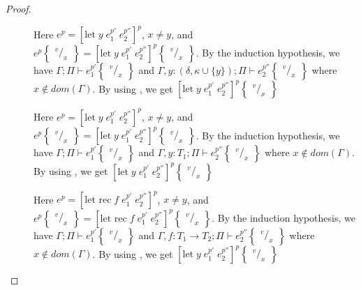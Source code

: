 \documentclass[../../master.tex]{subfiles}
\begin{document}
\begin{proof}
\begin{description}
		\item[] Here $e^p=[\mbox{let}\;y\;e_1^{p'}\;e_2^{p''}]^p$, $x\neq y$, and $e^p\begin{Bmatrix} ^v/_x \end{Bmatrix}=[\mbox{let}\;y\;e_1^{p'}\;e_2^{p''}]^p\begin{Bmatrix} ^v/_x \end{Bmatrix}$.
			By the induction hypothesis, we have $\Gamma;\Pi\vdash e_1^{p'}\begin{Bmatrix} ^v/_x \end{Bmatrix}$ and $\Gamma,y:(\delta,\kappa\cup\{y\});\Pi\vdash e_2^{p''}\begin{Bmatrix} ^v/_x \end{Bmatrix}$ where $x\notin dom(\Gamma)$.
			By using , we get $[\mbox{let}\;y\;e_1^{p'}\;e_2^{p''}]^p\begin{Bmatrix} ^v/_x \end{Bmatrix}$

		\item[] Here $e^p=[\mbox{let}\;y\;e_1^{p'}\;e_2^{p''}]^p$, $x\neq y$, and $e^p\begin{Bmatrix} ^v/_x \end{Bmatrix}=[\mbox{let}\;y\;e_1^{p'}\;e_2^{p''}]^p\begin{Bmatrix} ^v/_x \end{Bmatrix}$.
			By the induction hypothesis, we have $\Gamma;\Pi\vdash e_1^{p'}\begin{Bmatrix} ^v/_x \end{Bmatrix}$ and $\Gamma,y:T_1;\Pi\vdash e_2^{p''}\begin{Bmatrix} ^v/_x \end{Bmatrix}$ where $x\notin dom(\Gamma)$.
			By using , we get $[\mbox{let}\;y\;e_1^{p'}\;e_2^{p''}]^p\begin{Bmatrix} ^v/_x \end{Bmatrix}$

		\item[] Here $e^p=[\mbox{let rec}\;f\;e_1^{p'}\;e_2^{p''}]^p$, $x\neq y$, and $e^p\begin{Bmatrix} ^v/_x \end{Bmatrix}=[\mbox{let rec}\;f\;e_1^{p'}\;e_2^{p''}]^p\begin{Bmatrix} ^v/_x \end{Bmatrix}$.
			By the induction hypothesis, we have $\Gamma;\Pi\vdash e_1^{p'}\begin{Bmatrix} ^v/_x \end{Bmatrix}$ and $\Gamma,f:T_1\rightarrow T_2;\Pi\vdash e_2^{p''}\begin{Bmatrix} ^v/_x \end{Bmatrix}$ where $x\notin dom(\Gamma)$.
			By using , we get $[\mbox{let}\;y\;e_1^{p'}\;e_2^{p''}]^p\begin{Bmatrix} ^v/_x \end{Bmatrix}$


\end{description}
\end{proof}
\end{document}
